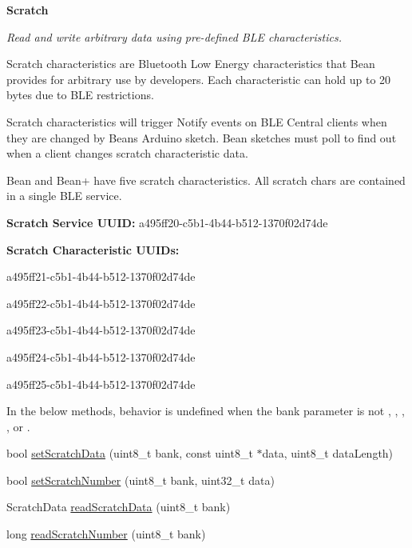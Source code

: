 \begin{Indent}{\bf Scratch}\par
{\em Read and write arbitrary data using pre-\/defined B\+L\+E characteristics.

Scratch characteristics are Bluetooth Low Energy characteristics that Bean provides for arbitrary use by developers. Each characteristic can hold up to 20 bytes due to B\+L\+E restrictions.

Scratch characteristics will trigger Notify events on B\+L\+E Central clients when they are changed by Bean\textquotesingle{}s Arduino sketch. Bean sketches must poll to find out when a client changes scratch characteristic data.

Bean and Bean+ have five scratch characteristics. All scratch chars are contained in a single B\+L\+E service.


\begin{DoxyItemize}
\item {\bfseries Scratch Service U\+U\+I\+D\+:} {\ttfamily a495ff20-\/c5b1-\/4b44-\/b512-\/1370f02d74de}
\item {\bfseries Scratch Characteristic U\+U\+I\+Ds\+:}
\begin{DoxyEnumerate}
\item {\ttfamily a495ff21-\/c5b1-\/4b44-\/b512-\/1370f02d74de}
\item {\ttfamily a495ff22-\/c5b1-\/4b44-\/b512-\/1370f02d74de}
\item {\ttfamily a495ff23-\/c5b1-\/4b44-\/b512-\/1370f02d74de}
\item {\ttfamily a495ff24-\/c5b1-\/4b44-\/b512-\/1370f02d74de}
\item {\ttfamily a495ff25-\/c5b1-\/4b44-\/b512-\/1370f02d74de}
\end{DoxyEnumerate}
\end{DoxyItemize}

In the below methods, behavior is undefined when the {\ttfamily bank} parameter is not {}, {}, {}, {}, or {}. }\begin{DoxyCompactItemize}
\item 
bool \hyperlink{class_bean_class_a6a8c9b33ada6cc7da1d9229dd0d7849e}{set\+Scratch\+Data} (uint8\+\_\+t bank, const uint8\+\_\+t $\ast$data, uint8\+\_\+t data\+Length)
\item 
bool \hyperlink{class_bean_class_a74e7107c64bec91d676cdd534ac6bb4d}{set\+Scratch\+Number} (uint8\+\_\+t bank, uint32\+\_\+t data)
\item 
Scratch\+Data \hyperlink{class_bean_class_af5b9029cc816e5ce21263be975aa6050}{read\+Scratch\+Data} (uint8\+\_\+t bank)
\item 
long \hyperlink{class_bean_class_a4c835abe680607ce956af4f7fa965a20}{read\+Scratch\+Number} (uint8\+\_\+t bank)
\end{DoxyCompactItemize}
\end{Indent}

